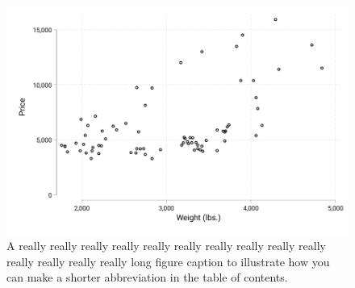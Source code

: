 \documentclass[12pt]{article}%
\begin{document}

  \begin{singlespace}
  \tableofcontents
   \listoftables
   \listoffigures
  \end{singlespace}
\newpage

 \FloatBarrier
\begin{figure}[h]
	\caption[Abbreviated Caption]{A really really really really really really really really really really really really really really long figure caption to illustrate how you can make a shorter abbreviation in the table of contents.}
	  \centering
	  \includegraphics[width=\linewidth]{../output/simple_scatter.pdf}

	\label{fig:simple_scatter}
\end{figure}
\end{document}
